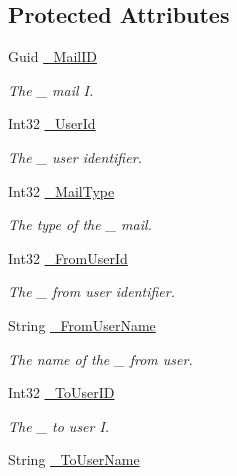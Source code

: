 \subsection*{Protected Attributes}
\begin{DoxyCompactItemize}
\item 
Guid \mbox{\hyperlink{class_t_net_1_1_message_1_1_mail_message_a04da306faf23ebacc9b8723b7324728a}{\+\_\+\+Mail\+ID}}
\begin{DoxyCompactList}\small\item\em The \+\_\+ mail I. \end{DoxyCompactList}\item 
Int32 \mbox{\hyperlink{class_t_net_1_1_message_1_1_mail_message_a9251349ed64e22f2382bd5dda1d366ed}{\+\_\+\+User\+Id}}
\begin{DoxyCompactList}\small\item\em The \+\_\+ user identifier. \end{DoxyCompactList}\item 
Int32 \mbox{\hyperlink{class_t_net_1_1_message_1_1_mail_message_a0785954031d8a2f7d7c48c6730860d88}{\+\_\+\+Mail\+Type}}
\begin{DoxyCompactList}\small\item\em The type of the \+\_\+ mail. \end{DoxyCompactList}\item 
Int32 \mbox{\hyperlink{class_t_net_1_1_message_1_1_mail_message_a82cea689aa3ffa35cd872c9710550ef9}{\+\_\+\+From\+User\+Id}}
\begin{DoxyCompactList}\small\item\em The \+\_\+ from user identifier. \end{DoxyCompactList}\item 
String \mbox{\hyperlink{class_t_net_1_1_message_1_1_mail_message_a9dcd0f005efa9288b85752c06f30936f}{\+\_\+\+From\+User\+Name}}
\begin{DoxyCompactList}\small\item\em The name of the \+\_\+ from user. \end{DoxyCompactList}\item 
Int32 \mbox{\hyperlink{class_t_net_1_1_message_1_1_mail_message_a46c06a08a937fc5a9835151054571b9d}{\+\_\+\+To\+User\+ID}}
\begin{DoxyCompactList}\small\item\em The \+\_\+ to user I. \end{DoxyCompactList}\item 
String \mbox{\hyperlink{class_t_net_1_1_message_1_1_mail_message_a90b988af53646760be793cc832f458f0}{\+\_\+\+To\+User\+Name}}

\end{DoxyCompactItemize}
